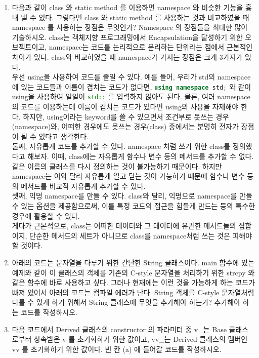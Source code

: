 \documentclass{article}
\newcommand{\inline}[1]{%
    \colorbox{beta-gray}{\lstinline[language=C++]{#1}}%
}
\begin{document}
\begin{enumerate}[itemsep=30pt]
        \item 다음과 같이 class 와 static method 를 이용하면 namespace 와 비슷한 기능을 흉내 낼 수 있다. 그렇다면 class 와 static method 를 사용하는 것과 비교하였을 때 namespace 를 사용하는 장점은 무엇인가? Namespace 의 장점들을 최대한 많이 기술하시오.
              class는 객체지향 프로그래밍에서 Encapsulation을 달성하기 위한 오브젝트이고, namespace는 코드를 논리적으로 분리하는 단위라는 점에서 근본적인 차이가 있다.
              class와 비교하였을 때 namespace가 가지는 장점은 크게 3가지가 있다.\\
              우선 using을 사용하여 코드를 줄일 수 있다. 예를 들어, 우리가 std의 namespace에 있는 코드들과 이름이 겹치는 코드가 없다면, \inline{using namespace std;}와 같이 using을 사용하여 일일이 \inline{std::}를 입력하지 않아도 된다.
              물론, 여러 namespace의 코드를 이용하는데 이름이 겹치는 코드가 있다면 using의 사용을 자제해야 한다. 하지만, using이라는 keyword를 쓸 수 있으면서 조건부로 못쓰는 경우(namespace)와, 어떠한 경우에도 못쓰는 경우(class) 중에서는 분명히 전자가 장점이 될 수 있다고 생각한다. \\
              둘째, 자유롭게 코드를 추가할 수 있다. namespace 처럼 쓰기 위한 class를 정의했다고 해보자.
              이때, class에는 자유롭게 함수나 변수 등의 메서드를 추가할 수 없다. 같은 이름의 클래스를 다시 정의하는 것이 불가능하기 때문이다.
              하지만 namespace는 이와 달리 자유롭게 열고 닫는 것이 가능하기 때문에 함수나 변수 등의 메서드를 비교적 자유롭게 추가할 수 있다.\\
              셋째, 익명 namespace를 만들 수 있다.
              class와 달리, 익명으로 namespace를 만들 수 있는 옵션을 제공함으로써, 이를 특정 코드의 접근을 힘들게 만드는 등의 특수한 경우에 활용할 수 있다.\\
              게다가 근본적으로, class는 어떠한 데이터와 그 데이터에 유관한 메서드들의 집합이지, 단순한 메서드의 세트가 아니므로 class를 namespace처럼 쓰는 것은 피해야 할 것이다.
        \item 아래의 코드는 문자열을 다루기 위한 간단한 String 클래스이다. main 함수에 있는 예제와 같이 이 클래스의 객체를 기존의 C-style 문자열을 처리하기 위한 strcpy 와 같은 함수에 바로 사용하고 싶다. 그러나 현재에는 이런 것을 가능하게 하는 코드가 빠져 있어서 아래의 코드는 컴파일 에러가 난다. String 객체를 C-style 문자열처럼 다룰 수 있게 하기 위해서 String 클래스에 무엇을 추가해야 하는가? 추가해야 하는 코드를 작성하시오.
        \item 다음 코드에서 Derived 클래스의 constructor 의 파라미터 중 v\_는 Base 클래스로부터 상속받은 v 를 초기화하기 위한 값이고, vv\_는 Derived 클래스의 멤버인 vv 를 초기화하기 위한 값이다. 빈 칸 (a) 에 들어갈 코드를 작성하시오.

\end{enumerate}
\end{document}
